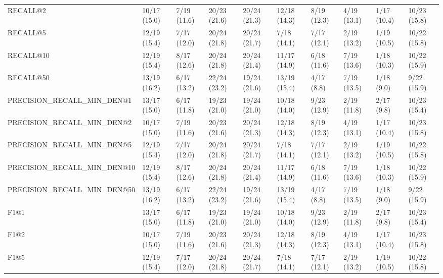 \begin{tabular}{llllllllll}
RECALL@2                    &   10/17 (15.0) &    7/19 (11.6) &      20/23 (21.6) &   20/24 (21.3) &  12/18 (14.3) &    8/19 (12.3) &         4/19 (13.1) &  1/17 (10.4) &  10/23 (15.8) \\
RECALL@5                    &   12/19 (15.4) &    7/17 (12.0) &      20/24 (21.8) &   20/24 (21.7) &   7/18 (14.1) &    7/17 (12.1) &         2/19 (13.2) &  1/19 (10.5) &  10/22 (15.8) \\
RECALL@10                   &   12/19 (15.4) &    8/17 (12.6) &      20/24 (21.8) &   20/24 (21.4) &  11/17 (14.9) &    6/18 (11.6) &         7/19 (13.6) &  1/18 (10.3) &  10/22 (15.9) \\
RECALL@50                   &   13/19 (16.2) &    6/17 (13.2) &      22/24 (23.2) &   19/24 (21.6) &  13/19 (15.4) &     4/17 (8.8) &         7/19 (13.5) &   1/18 (9.0) &   9/22 (15.9) \\
PRECISION_RECALL_MIN_DEN@1  &   13/17 (15.0) &    6/17 (11.8) &      19/23 (21.0) &   19/24 (21.0) &  10/18 (14.0) &    9/23 (12.9) &         2/19 (11.8) &   2/17 (9.8) &  10/23 (15.4) \\
PRECISION_RECALL_MIN_DEN@2  &   10/17 (15.0) &    7/19 (11.6) &      20/23 (21.6) &   20/24 (21.3) &  12/18 (14.3) &    8/19 (12.3) &         4/19 (13.1) &  1/17 (10.4) &  10/23 (15.8) \\
PRECISION_RECALL_MIN_DEN@5  &   12/19 (15.4) &    7/17 (12.0) &      20/24 (21.8) &   20/24 (21.7) &   7/18 (14.1) &    7/17 (12.1) &         2/19 (13.2) &  1/19 (10.5) &  10/22 (15.8) \\
PRECISION_RECALL_MIN_DEN@10 &   12/19 (15.4) &    8/17 (12.6) &      20/24 (21.8) &   20/24 (21.4) &  11/17 (14.9) &    6/18 (11.6) &         7/19 (13.6) &  1/18 (10.3) &  10/22 (15.9) \\
PRECISION_RECALL_MIN_DEN@50 &   13/19 (16.2) &    6/17 (13.2) &      22/24 (23.2) &   19/24 (21.6) &  13/19 (15.4) &     4/17 (8.8) &         7/19 (13.5) &   1/18 (9.0) &   9/22 (15.9) \\
F1@1                        &   13/17 (15.0) &    6/17 (11.8) &      19/23 (21.0) &   19/24 (21.0) &  10/18 (14.0) &    9/23 (12.9) &         2/19 (11.8) &   2/17 (9.8) &  10/23 (15.4) \\
F1@2                        &   10/17 (15.0) &    7/19 (11.6) &      20/23 (21.6) &   20/24 (21.3) &  12/18 (14.3) &    8/19 (12.3) &         4/19 (13.1) &  1/17 (10.4) &  10/23 (15.8) \\
F1@5                        &   12/19 (15.4) &    7/17 (12.0) &      20/24 (21.8) &   20/24 (21.7) &   7/18 (14.1) &    7/17 (12.1) &         2/19 (13.2) &  1/19 (10.5) &  10/22 (15.8) \\

\end{tabular}
